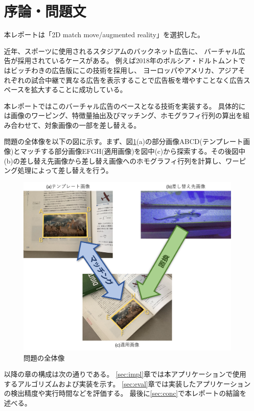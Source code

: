 \section{序論・問題文}
本レポートは「2D match move/augmented reality」を選択した。

近年、スポーツに使用されるスタジアムのバックネット広告に、
バーチャル広告が採用されているケースがある。
例えば2018年のボルシア・ドルトムントではビッチわきの広告版にこの技術を採用し、
ヨーロッパやアメリカ、アジアそれぞれの試合中継で異なる広告を表示することで広告板を増やすことなく広告スペースを拡大することに成功している\cite{bvb}。

本レポートではこのバーチャル広告のベースとなる技術を実装する。
具体的には画像のワーピング、特徴量抽出及びマッチング、ホモグラフィ行列の算出を組み合わせて、対象画像の一部を差し替える。

問題の全体像を以下の図に示す。まず、図\ref{fig:question}(a)の部分画像ABCD(テンプレート画像)とマッチする部分画像EFGH(適用画像)を図中(c)から探索する。その後図中(b)の差し替え先画像から差し替え画像へのホモグラフィ行列を計算し、ワーピング処理によって差し替えを行う。

\begin{figure}[h]
    \centering
    \includegraphics[width=1\linewidth]{fig/question.png}
    \caption{問題の全体像}
    \label{fig:question}
\end{figure}

以降の章の構成は次の通りである。
\ref{sec:impl}章では本アプリケーションで使用するアルゴリズムおよび実装を示す。
\ref{sec:eval}章では実装したアプリケーションの検出精度や実行時間などを評価する。
最後に\ref{sec:conc}で本レポートの結論を述べる。